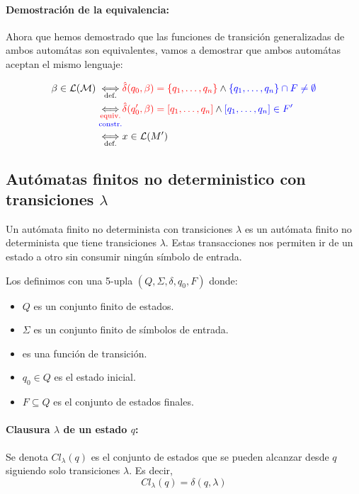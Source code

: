 \paragraph{Demostración de la equivalencia:} Ahora que hemos demostrado que las funciones de transición generalizadas de ambos automátas son equivalentes, vamos a demostrar que ambos automátas aceptan el mismo lenguaje:

\begin{align*}
  \beta \in \mathcal{L}(\mathcal{M})  \iffa{def.} & \red{\hat\delta(q_0, \beta) = \{q_1,\dots, q_n\}}\land\blue{\{q_1,\dots,q_n\}\cap F \neq \emptyset} \\
  \iffab{\red{equiv.}}{\blue{constr.}}            & \red{\hat\delta(q_0', \beta) = [q_1,\dots, q_n]}\land\blue{[q_1,\dots,q_n]\in F'}                   \\
  \iffa{def.}                                     & x\in\mathcal{L}(M')
\end{align*}

\subsection{Autómatas finitos no deterministico con transiciones  \texorpdfstring{\(\lambda\)}{lambda}}
\label{sec:afd-lambda}
Un autómata finito no determinista con transiciones \(\lambda\) es un autómata finito no determinista que tiene transiciones \(\lambda\). Estas transacciones nos permiten ir de un estado a otro sin consumir ningún símbolo de entrada.

Los definimos con una 5-upla \((Q,\Sigma,\delta,q_0,F)\) donde:
\begin{itemize}
  \item \(Q\) es un conjunto finito de estados.
  \item \(\Sigma\) es un conjunto finito de símbolos de entrada.
  \item {} es una función de transición.
  \item \(q_0 \in Q\) es el estado inicial.
  \item \(F \subseteq Q\) es el conjunto de estados finales.
\end{itemize}

\paragraph{Clausura \(\lambda\) de un estado \(q\):} Se denota \(Cl_\lambda(q)\) es el conjunto de estados que se pueden alcanzar desde \(q\) siguiendo solo transiciones \(\lambda\). Es decir, \[Cl_\lambda(q) = \delta(q,\lambda)\]

